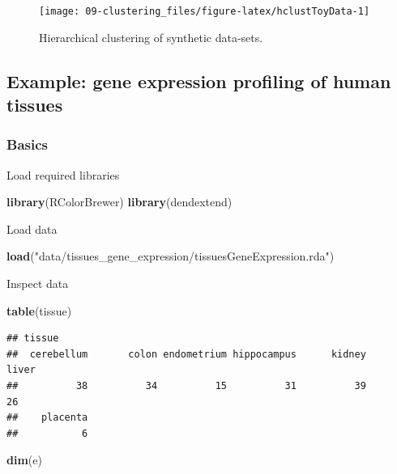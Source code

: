 \documentclass[]{book}
\newenvironment{Shaded}{\begin{snugshade}}{\end{snugshade}}
\newcommand{\KeywordTok}[1]{\textcolor[rgb]{0.13,0.29,0.53}{\textbf{{#1}}}}
\newcommand{\StringTok}[1]{\textcolor[rgb]{0.31,0.60,0.02}{{#1}}}
\newcommand{\NormalTok}[1]{{#1}}
\theoremstyle{definition}
\theoremstyle{definition}
\theoremstyle{definition}
\theoremstyle{remark}
\begin{document}
\begin{figure}

{\centering \texttt{[image: 09-clustering\_files/figure-latex/hclustToyData-1]} 

}

\caption{Hierarchical clustering of synthetic data-sets. }\label{fig:hclustToyData}
\end{figure}

\subsection{Example: gene expression profiling of human
tissues}\label{example-gene-expression-profiling-of-human-tissues}

\subsubsection{Basics}\label{basics}

Load required libraries

\begin{Shaded}
\begin{Highlighting}[]
\KeywordTok{library}\NormalTok{(RColorBrewer)}
\KeywordTok{library}\NormalTok{(dendextend)}
\end{Highlighting}
\end{Shaded}

Load data

\begin{Shaded}
\begin{Highlighting}[]
\KeywordTok{load}\NormalTok{(}\StringTok{"data/tissues_gene_expression/tissuesGeneExpression.rda"}\NormalTok{)}
\end{Highlighting}
\end{Shaded}

Inspect data

\begin{Shaded}
\begin{Highlighting}[]
\KeywordTok{table}\NormalTok{(tissue)}
\end{Highlighting}
\end{Shaded}

\begin{verbatim}
## tissue
##  cerebellum       colon endometrium hippocampus      kidney       liver 
##          38          34          15          31          39          26 
##    placenta 
##           6
\end{verbatim}

\begin{Shaded}
\begin{Highlighting}[]
\KeywordTok{dim}\NormalTok{(e)}
\end{Highlighting}
\end{Shaded}
\end{document}
